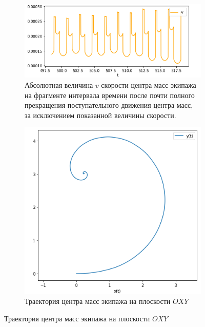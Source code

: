 \begin{figure}[htb]
\begin{subfigure}[t]{\textwidth}
            \includegraphics[width=\linewidth]{content/pic/new/impact/impact_3_v_late.png}
            \vspace{-25pt}
            \caption{Абсолютная величина $v$ скорости центра масс экипажа на фрагменте интервала времени после почти полного прекращения поступательного движения центра масс, за исключением показанной величины скорости.}
            \label{fig:wrench_v_late}
        \end{subfigure}
    \endminipage
    \quad
        \vspace{-35pt}
        \begin{subfigure}[t]{\textwidth}
            \centering
            \includegraphics[width=\linewidth]{content/pic/new/impact/impact_3_traj.png}
            \vspace{-25pt}
            \caption{Траектория центра масс экипажа на плоскости $OXY$}

\end{subfigure}
\end{figure}
